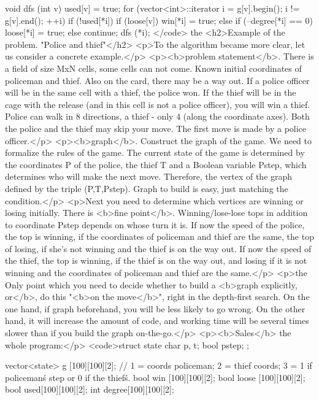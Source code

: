 void dfs (int v) {
used[v] = true;
for (vector<int>::iterator i = g[v].begin(); i != g[v].end(); ++i)
if (!used[*i]) {
if (loose[v])
win[*i] = true;
else if (--degree[*i] == 0)
loose[*i] = true;
else
continue;
dfs (*i);
}
}</code>
the <h2>Example of the problem. "Police and thief"</h2>
<p>To the algorithm became more clear, let us consider a concrete example.</p>
<p><b>problem statement</b>. There is a field of size MxN cells, some cells can not come. Known initial coordinates of policeman and thief. Also on the card, there may be a way out. If a police officer will be in the same cell with a thief, the police won. If the thief will be in the cage with the release (and in this cell is not a police officer), you will win a thief. Police can walk in 8 directions, a thief - only 4 (along the coordinate axes). Both the police and the thief may skip your move. The first move is made by a police officer.</p>
<p><b>graph</b>. Construct the graph of the game. We need to formalize the rules of the game. The current state of the game is determined by the coordinates P of the police, the thief T and a Boolean variable Pstep, which determines who will make the next move. Therefore, the vertex of the graph defined by the triple (P,T,Pstep). Graph to build is easy, just matching the condition.</p>
<p>Next you need to determine which vertices are winning or losing initially. There is <b>fine point</b>. Winning/lose-lose tops in addition to coordinate Pstep depends on whose turn it is. If now the speed of the police, the top is winning, if the coordinates of policeman and thief are the same, the top of losing, if she's not winning and the thief is on the way out. If now the speed of the thief, the top is winning, if the thief is on the way out, and losing if it is not winning and the coordinates of policeman and thief are the same.</p>
<p>the Only point which you need to decide whether to build a <b>graph explicitly, or</b>, do this "<b>on the move</b>", right in the depth-first search. On the one hand, if graph beforehand, you will be less likely to go wrong. On the other hand, it will increase the amount of code, and working time will be several times slower than if you build the graph on-the-go.</p>
<p><b>Sales</b> the whole program:</p>
<code>struct state {
char p, t;
bool pstep;
};

vector<state> g [100][100][2];
// 1 = coords policeman; 2 = thief coords; 3 = 1 if policeman\'s step or 0 if the thief\'s.
bool win [100][100][2];
bool loose [100][100][2];
bool used[100][100][2];
int degree[100][100][2];

